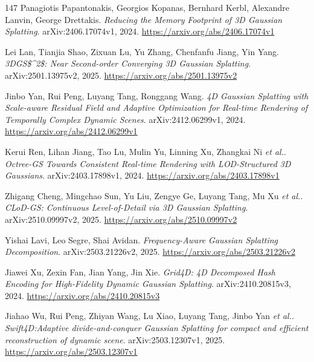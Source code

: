 \documentclass[11pt,a4paper]{article}
\begin{document}
\begin{thebibliography}{147}
Panagiotis Papantonakis, Georgios Kopanas, Bernhard Kerbl, Alexandre Lanvin, George Drettakis.
\newblock \emph{Reducing the Memory Footprint of 3D Gaussian Splatting}.
\newblock arXiv:2406.17074v1, 2024.
\newblock \url{https://arxiv.org/abs/2406.17074v1}

Lei Lan, Tianjia Shao, Zixuan Lu, Yu Zhang, Chenfanfu Jiang, Yin Yang.
\newblock \emph{3DGS\$\textasciicircum{}2\$: Near Second-order Converging 3D Gaussian Splatting}.
\newblock arXiv:2501.13975v2, 2025.
\newblock \url{https://arxiv.org/abs/2501.13975v2}

Jinbo Yan, Rui Peng, Luyang Tang, Ronggang Wang.
\newblock \emph{4D Gaussian Splatting with Scale-aware Residual Field and Adaptive Optimization for Real-time Rendering of Temporally Complex Dynamic Scenes}.
\newblock arXiv:2412.06299v1, 2024.
\newblock \url{https://arxiv.org/abs/2412.06299v1}

Kerui Ren, Lihan Jiang, Tao Lu, Mulin Yu, Linning Xu, Zhangkai Ni \emph{et al.}.
\newblock \emph{Octree-GS Towards Consistent Real-time Rendering with LOD-Structured 3D Gaussians}.
\newblock arXiv:2403.17898v1, 2024.
\newblock \url{https://arxiv.org/abs/2403.17898v1}

Zhigang Cheng, Mingchao Sun, Yu Liu, Zengye Ge, Luyang Tang, Mu Xu \emph{et al.}.
\newblock \emph{CLoD-GS: Continuous Level-of-Detail via 3D Gaussian Splatting}.
\newblock arXiv:2510.09997v2, 2025.
\newblock \url{https://arxiv.org/abs/2510.09997v2}

Yishai Lavi, Leo Segre, Shai Avidan.
\newblock \emph{Frequency-Aware Gaussian Splatting Decomposition}.
\newblock arXiv:2503.21226v2, 2025.
\newblock \url{https://arxiv.org/abs/2503.21226v2}

Jiawei Xu, Zexin Fan, Jian Yang, Jin Xie.
\newblock \emph{Grid4D: 4D Decomposed Hash Encoding for High-Fidelity Dynamic Gaussian Splatting}.
\newblock arXiv:2410.20815v3, 2024.
\newblock \url{https://arxiv.org/abs/2410.20815v3}

Jiahao Wu, Rui Peng, Zhiyan Wang, Lu Xiao, Luyang Tang, Jinbo Yan \emph{et al.}.
\newblock \emph{Swift4D:Adaptive divide-and-conquer Gaussian Splatting for compact and efficient reconstruction of dynamic scene}.
\newblock arXiv:2503.12307v1, 2025.
\newblock \url{https://arxiv.org/abs/2503.12307v1}


\end{thebibliography}
\end{document}
